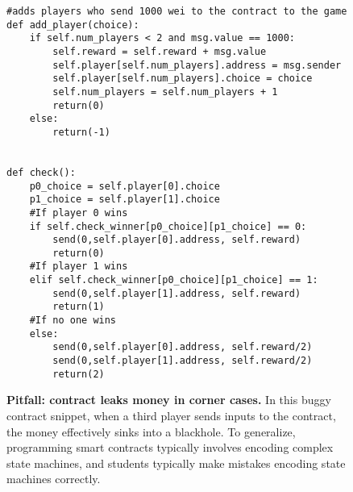 \documentclass[10pt,twocolumn,letterpaper]{article}
\newcommand{\ignore}[1]{}
\begin{document}
\begin{figure}
\begin{mdframed}
\begin{verbatim}
#adds players who send 1000 wei to the contract to the game
def add_player(choice):
	if self.num_players < 2 and msg.value == 1000:
		self.reward = self.reward + msg.value
		self.player[self.num_players].address = msg.sender
		self.player[self.num_players].choice = choice
		self.num_players = self.num_players + 1
		return(0)
	else:
		return(-1)


def check():
	p0_choice = self.player[0].choice
	p1_choice = self.player[1].choice
	#If player 0 wins
	if self.check_winner[p0_choice][p1_choice] == 0:
		send(0,self.player[0].address, self.reward)
		return(0)
	#If player 1 wins
	elif self.check_winner[p0_choice][p1_choice] == 1:
		send(0,self.player[1].address, self.reward)
		return(1)
	#If no one wins
	else:
		send(0,self.player[0].address, self.reward/2)
		send(0,self.player[1].address, self.reward/2)
		return(2)
\end{verbatim}
\end{mdframed}
\caption{
\label{fig:moneyleaks}
{\bf Pitfall: contract leaks money in corner cases.}
In this buggy contract snippet, when a third player 
sends inputs to the contract, the
money effectively sinks into a blackhole.
To generalize, programming smart contracts 
typically involves encoding complex state machines, and
students typically make mistakes encoding 
state machines correctly. 
}
\end{figure}

\ignore{
In this section, a user adds themselves to the game by sending a small amount of ether with their transaction. The contract takes this ether, stored in $msg.value$, and adds it to the winnings pool, the prize that the winner of each round will receive. Let's consider two scenarios our contract currently allows 1) a potential entrant sends too much or too little ether, 2) there are already two participants, so additional players send transactions to join, but are not allowed. In both of the following scenarios the contract will keep their money. If someone sent too much or too little to enter they will not be added as a player, but their funds will be kept. Even worse, if the match is full any person who tries to join (they have no way of knowing it is full) will pay to play but never be added to a game! Both of these errors will cause distrust in our contract, eventually resulting in the community not trusting this particular contract and, more importantly, this contract's author - you.
}
\end{document}
